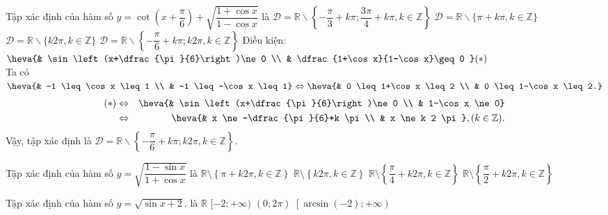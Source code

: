 \begin{ex}%
	Tập xác định của hàm số $ y=\cot \left(x+\dfrac{\pi}{6}\right)+\sqrt{\dfrac{1+\cos x}{1-\cos x}} $ là
	\choice
	{$ \mathscr{D}=\mathbb{R} \backslash\left\{-\dfrac{\pi}{3}+k \pi ; \dfrac{3 \pi}{4}+k \pi, k \in \mathbb{Z}\right\}  $}
	{$ \mathscr{D}=\mathbb{R} \backslash\{\pi+k \pi, k \in \mathbb{Z}\}  $}
	{$ \mathscr{D}=\mathbb{R} \backslash\{k 2 \pi, k \in \mathbb{Z}\}  $}
	{\True$ \mathscr{D}=\mathbb{R} \backslash\left\{-\dfrac{\pi}{6}+k \pi ; k 2 \pi, k \in \mathbb{Z}\right\}  $}
	\loigiai
	{
		Điều kiện: $ \heva{& \sin\left(x+\dfrac{\pi}{6}\right)\ne 0 \\ & \dfrac{1+\cos x}{1-\cos x}\geq 0 }  (\ast)$\\
		Ta có $ \heva{& -1 \leq \cos x \leq 1 \\ & -1 \leq -\cos x \leq 1} \Leftrightarrow \heva{& 0 \leq 1+\cos x \leq 2 \\ & 0 \leq 1-\cos x \leq 2.}$
		\begin{eqnarray*}
			(\ast) &\Leftrightarrow& \heva{& \sin\left(x+\dfrac{\pi}{6}\right)\ne 0 \\ & 1-\cos x \ne 0}\\
			&\Leftrightarrow& \heva{& x \ne -\dfrac{\pi}{6}+k \pi \\ & x \ne k 2 \pi},(k \in \mathbb{Z}).
		\end{eqnarray*}
		Vậy, tập xác định là $ \mathscr{D}=\mathbb{R} \backslash\left\{-\dfrac{\pi}{6}+k \pi ; k 2 \pi, k \in \mathbb{Z}\right\}  $.
	}
\end{ex}
\begin{ex}%
	Tập xác định của hàm số $y=\sqrt{\dfrac{1-\sin x}{1+\cos x}}$ là
	\choice
	{\True $\mathbb{R}\setminus\left\{\pi+k2\pi, k\in\mathbb{Z}\right\}$}
	{$\mathbb{R}\setminus\left\{k2\pi, k\in\mathbb{Z}\right\}$}
	{$\mathbb{R}\setminus\left\{\dfrac{\pi}{4}+k2\pi, k\in\mathbb{Z}\right\}$}
	{$\mathbb{R}\setminus\left\{\dfrac{\pi}{2}+k2\pi, k\in\mathbb{Z}\right\}$}
\end{ex}
\begin{ex}%
	Tập xác định của hàm số $y=\sqrt{\sin x+2}$. là
	\choice
	{\True $\mathbb{R}$}
	{$[-2;+\infty)$}
	{$(0;2\pi)$}
	{$\left[\arcsin(-2);+\infty\right)$}
\end{ex}
